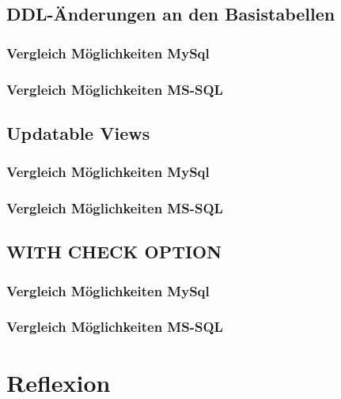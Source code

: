 \documentclass[11pt,a4paper,parskip=half]{scrartcl}
\begin{document}
\subsection{DDL-Änderungen an den Basistabellen}
\subsubsection{Vergleich Möglichkeiten MySql}
\subsubsection{Vergleich Möglichkeiten MS-SQL}

\subsection{Updatable Views}
\subsubsection{Vergleich Möglichkeiten MySql}
\subsubsection{Vergleich Möglichkeiten MS-SQL}

\subsection{WITH CHECK OPTION}
\subsubsection{Vergleich Möglichkeiten MySql}
\subsubsection{Vergleich Möglichkeiten MS-SQL}

\section{Reflexion}
\end{document}
